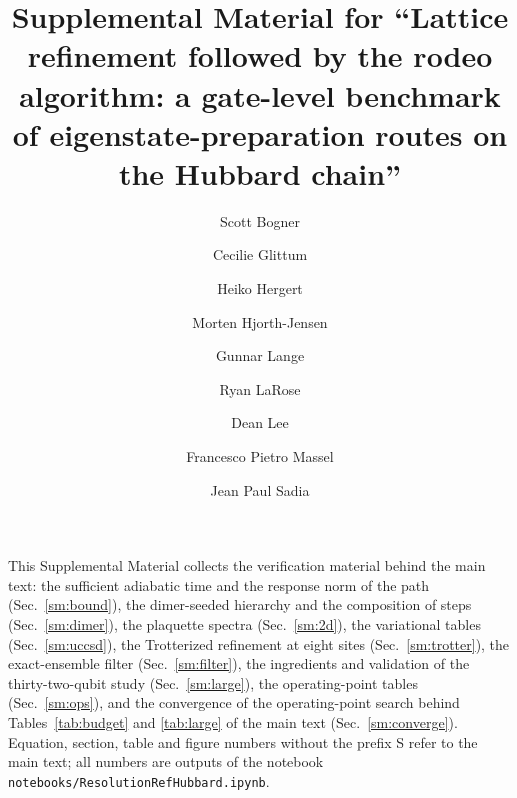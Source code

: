 \documentclass[a4paper,11pt,noarxiv]{quantumarticle}
\begin{document}
\title{Supplemental Material for ``Lattice refinement followed by the rodeo
algorithm: a gate-level benchmark of eigenstate-preparation routes on the
Hubbard chain''}
\author{Scott Bogner}
\author{Cecilie Glittum}
\author{Heiko Hergert}
\author{Morten Hjorth-Jensen}
\author{Gunnar Lange}
\author{Ryan LaRose}
\author{Dean Lee}
\author{Francesco Pietro Massel}
\author{Jean Paul Sadia}
\maketitle

This Supplemental Material collects the verification material behind the
main text: the sufficient adiabatic time and the response norm of the path
(Sec.~\ref{sm:bound}), the dimer-seeded hierarchy and the composition of
steps (Sec.~\ref{sm:dimer}), the plaquette spectra (Sec.~\ref{sm:2d}), the
variational tables (Sec.~\ref{sm:uccsd}), the Trotterized refinement at
eight sites (Sec.~\ref{sm:trotter}), the exact-ensemble filter
(Sec.~\ref{sm:filter}), the ingredients and validation of the
thirty-two-qubit study (Sec.~\ref{sm:large}), the operating-point tables
(Sec.~\ref{sm:ops}), and the convergence of the operating-point search
behind Tables~\ref{tab:budget} and \ref{tab:large} of the main text
(Sec.~\ref{sm:converge}).  Equation, section, table and figure numbers without
the prefix S refer to the main text; all numbers are outputs of the
notebook \texttt{notebooks/ResolutionRefHubbard.ipynb}.
\end{document}
